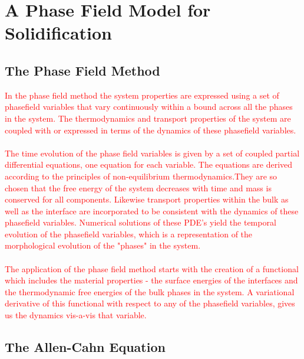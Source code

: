 \documentclass[12pt,a4paper]{report}
\begin{document}
\chapter{A Phase Field Model for Solidification}

\section{The Phase Field Method}

\textcolor{red}{In the phase field method the system properties are expressed using a set of phasefield variables 
that vary continuously within a bound across all the phases in the system. The thermodynamics and 
transport properties of the system are coupled with or expressed in terms of the dynamics of these 
phasefield variables.\\
\\
The time evolution of the phase field variables is given by a set of coupled partial differential 
equations, one equation for each variable. The equations are derived according to the principles of 
non-equilibrium thermodynamics.They are so chosen that the free energy of the system decreases with 
time and mass is conserved for all components. Likewise transport properties within the bulk as well as 
the interface are incorporated to be consistent with the dynamics of these phasefield variables. 
Numerical solutions of these PDE's yield the temporal evolution of the phasefield variables, which is 
a representation of the morphological evolution of the "phases" in the system.\\
\\
The application of the phase field method starts with the creation of a functional which includes the 
material properties - the surface energies of the interfaces and the thermodynamic free energies 
of the bulk phases in the system. A variational derivative of this functional with respect to any of the 
phasefield variables, gives us the dynamics vis-a-vis that variable.}\\


\section{The Allen-Cahn Equation}
\end{document}
